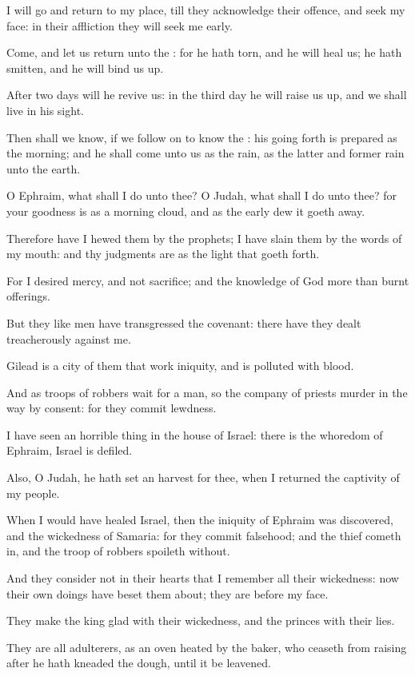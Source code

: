 \Verse I will go and return to my place, till they acknowledge their offence, and seek my face: in their affliction they will seek me early.


\Chapter
\Verse Come, and let us return unto the \LORD: for he hath torn, and he will heal us; he hath smitten, and he will bind us up.

\Verse After two days will he revive us: in the third day he will raise us up, and we shall live in his sight.

\Verse Then shall we know, if we follow on to know the \LORD: his going forth is prepared as the morning; and he shall come unto us as the rain, as the latter and former rain unto the earth.

\Verse O Ephraim, what shall I do unto thee? O Judah, what shall I do unto thee? for your goodness is as a morning cloud, and as the early dew it goeth away.

\Verse Therefore have I hewed them by the prophets; I have slain them by the words of my mouth: and thy judgments are as the light that goeth forth.

\Verse For I desired mercy, and not sacrifice; and the knowledge of God more than burnt offerings.

\Verse But they like men have transgressed the covenant: there have they dealt treacherously against me.

\Verse Gilead is a city of them that work iniquity, and is polluted with blood.

\Verse And as troops of robbers wait for a man, so the company of priests murder in the way by consent: for they commit lewdness.

\Verse I have seen an horrible thing in the house of Israel: there is the whoredom of Ephraim, Israel is defiled.

\Verse Also, O Judah, he hath set an harvest for thee, when I returned the captivity of my people.


\Chapter
\Verse When I would have healed Israel, then the iniquity of Ephraim was discovered, and the wickedness of Samaria: for they commit falsehood; and the thief cometh in, and the troop of robbers spoileth without.

\Verse And they consider not in their hearts that I remember all their wickedness: now their own doings have beset them about; they are before my face.

\Verse They make the king glad with their wickedness, and the princes with their lies.

\Verse They are all adulterers, as an oven heated by the baker, who ceaseth from raising after he hath kneaded the dough, until it be leavened.

